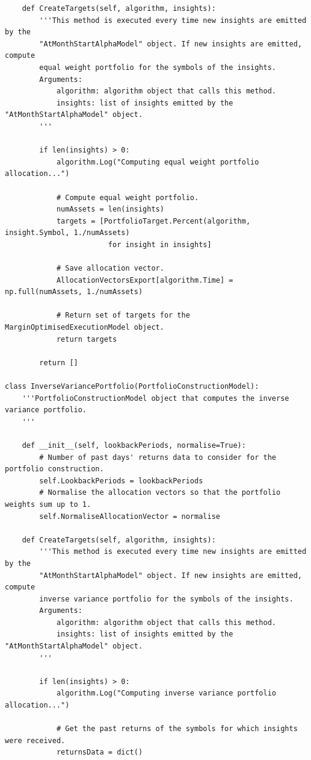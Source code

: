 \begin{verbatim}
    def CreateTargets(self, algorithm, insights):
        '''This method is executed every time new insights are emitted by the
        "AtMonthStartAlphaModel" object. If new insights are emitted, compute
        equal weight portfolio for the symbols of the insights.
        Arguments:
            algorithm: algorithm object that calls this method.
            insights: list of insights emitted by the "AtMonthStartAlphaModel" object.
        '''
        
        if len(insights) > 0:
            algorithm.Log("Computing equal weight portfolio allocation...")
            
            # Compute equal weight portfolio.
            numAssets = len(insights)
            targets = [PortfolioTarget.Percent(algorithm, insight.Symbol, 1./numAssets)
                        for insight in insights]
            
            # Save allocation vector.
            AllocationVectorsExport[algorithm.Time] = np.full(numAssets, 1./numAssets)
               
            # Return set of targets for the MarginOptimisedExecutionModel object.
            return targets
            
        return []
        
class InverseVariancePortfolio(PortfolioConstructionModel):
    '''PortfolioConstructionModel object that computes the inverse variance portfolio.
    '''
    
    def __init__(self, lookbackPeriods, normalise=True):
        # Number of past days' returns data to consider for the portfolio construction.
        self.LookbackPeriods = lookbackPeriods
        # Normalise the allocation vectors so that the portfolio weights sum up to 1.
        self.NormaliseAllocationVector = normalise
        
    def CreateTargets(self, algorithm, insights):
        '''This method is executed every time new insights are emitted by the
        "AtMonthStartAlphaModel" object. If new insights are emitted, compute
        inverse variance portfolio for the symbols of the insights.
        Arguments:
            algorithm: algorithm object that calls this method.
            insights: list of insights emitted by the "AtMonthStartAlphaModel" object.
        '''
        
        if len(insights) > 0:
            algorithm.Log("Computing inverse variance portfolio allocation...")
            
            # Get the past returns of the symbols for which insights were received.
            returnsData = dict()
        

\end{verbatim}
